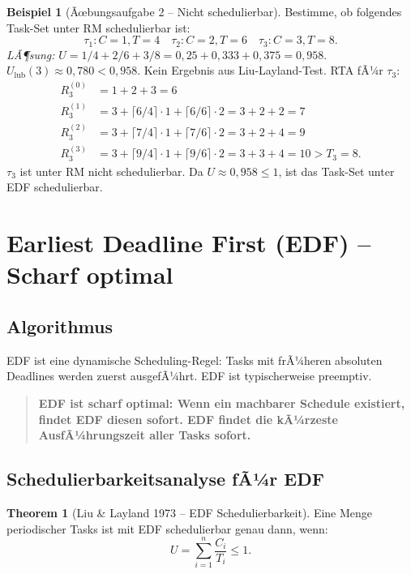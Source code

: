 ﻿\documentclass[a4paper,12pt]{report}
\theoremstyle{definition}
\newtheorem{beispiel}{Beispiel}[chapter]
\newtheorem{theorem}{Theorem}[chapter]
\begin{document}
\begin{beispiel}[Ãœbungsaufgabe 2 -- Nicht schedulierbar]
	Bestimme, ob folgendes Task-Set unter RM schedulierbar ist:
	\[
		\tau_1: C=1, T=4 \quad \tau_2: C=2, T=6 \quad \tau_3: C=3, T=8.
	\]
	\textit{LÃ¶sung:} $U = 1/4 + 2/6 + 3/8 = 0{,}25 + 0{,}333 + 0{,}375 = 0{,}958$.
	$U_{\text{lub}}(3) \approx 0{,}780 < 0{,}958$. Kein Ergebnis aus Liu-Layland-Test.
	RTA fÃ¼r $\tau_3$:
	\begin{align*}
		R_3^{(0)} &= 1 + 2 + 3 = 6 \\
		R_3^{(1)} &= 3 + \lceil 6/4\rceil\cdot1 + \lceil 6/6\rceil\cdot2 = 3+2+2 = 7 \\
		R_3^{(2)} &= 3 + \lceil 7/4\rceil\cdot1 + \lceil 7/6\rceil\cdot2 = 3+2+4 = 9 \\
		R_3^{(3)} &= 3 + \lceil 9/4\rceil\cdot1 + \lceil 9/6\rceil\cdot2 = 3+3+4 = 10 > T_3 = 8.
	\end{align*}
	$\tau_3$ ist unter RM nicht schedulierbar. Da $U \approx 0{,}958 \leq 1$,
	ist das Task-Set unter EDF schedulierbar.
\end{beispiel}

\section{Earliest Deadline First (EDF) -- Scharf optimal}

\subsection{Algorithmus}

EDF ist eine dynamische Scheduling-Regel: Tasks mit frÃ¼heren absoluten Deadlines
werden zuerst ausgefÃ¼hrt. EDF ist typischerweise preemptiv.

\begin{quote}
\textbf{EDF ist scharf optimal: Wenn ein machbarer Schedule existiert, findet EDF diesen sofort. EDF findet die kÃ¼rzeste AusfÃ¼hrungszeit aller Tasks sofort.}
\end{quote}

\subsection{Schedulierbarkeitsanalyse fÃ¼r EDF}

\begin{theorem}[Liu \& Layland 1973 -- EDF Schedulierbarkeit]
	\label{thm:edf_schedulierbar}
	Eine Menge periodischer Tasks ist mit EDF schedulierbar genau dann, wenn:
	\[
		U = \sum_{i=1}^{n} \frac{C_i}{T_i} \leq 1.
	\]
\end{theorem}
\end{document}
